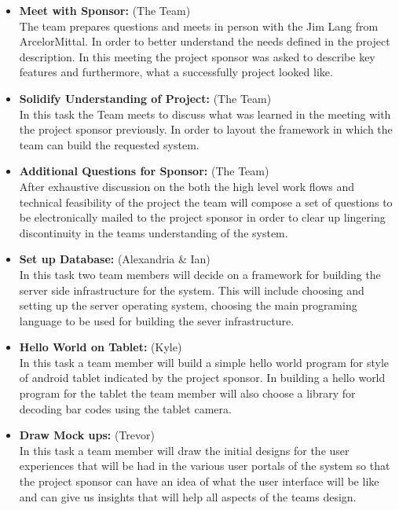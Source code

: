 \documentclass[Letter,11pt]{article}
\begin{document}
		\begin{itemize}
			\item\textbf{Meet with Sponsor:} (The Team)\\
			The team prepares questions and meets in person with the Jim Lang from ArcelorMittal. In order to better understand the needs defined in the project description. In this meeting the project sponsor was asked to describe key features and furthermore, what a successfully project looked like.
			
			\item \textbf{Solidify Understanding of Project:} (The Team)\\
			In this task the Team meets to discuss what was learned in the meeting with the project sponsor previously. In order to layout the framework in which the team can build the requested system.
			
			\item\textbf{Additional Questions for Sponsor:} (The Team)\\
			After exhaustive discussion on the both the high level work flows and technical feasibility of the project the team will compose a set of questions to be electronically mailed to the project sponsor in order to clear up lingering discontinuity in the teams understanding of the system.
			
			\item\textbf{Set up Database:} (Alexandria \& Ian)\\
			In this task two team members will decide on a framework for building the server side infrastructure for the system. This will include choosing and setting up the server operating system, choosing the main programing language to be used for building the sever infrastructure.
			
			\item\textbf{Hello World on Tablet:} (Kyle)\\
			In this task a team member will build a simple hello world program for style of android tablet indicated by the project sponsor. In building a hello world program for the tablet the team member will also choose a library for decoding bar codes using the tablet camera. 
			
			\item\textbf{Draw Mock ups:} (Trevor)\\
			In this task a team member will draw the initial designs for the user experiences that will be had in the various user portals of the system so that the project sponsor can have an idea of what the user interface will be like and can give us insights that will help all aspects of the teams design. 
			

\end{itemize}
\end{document}
